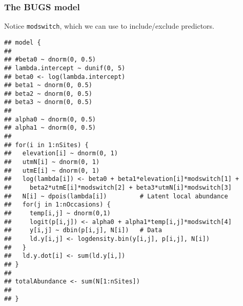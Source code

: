 \documentclass[color=usenames,dvipsnames]{beamer}\usepackage[]{graphicx}\usepackage[]{color}
\makeatletter
\newenvironment{kframe}{%
 \def\at@end@of@kframe{}%
 \ifinner\ifhmode%
  \def\at@end@of@kframe{\end{minipage}}%
  \begin{minipage}{\columnwidth}%
 \fi\fi%
 \def\FrameCommand##1{\hskip\@totalleftmargin \hskip-\fboxsep
 \colorbox{shadecolor}{##1}\hskip-\fboxsep
     \hskip-\linewidth \hskip-\@totalleftmargin \hskip\columnwidth}%
 \MakeFramed {\advance\hsize-\width
   \@totalleftmargin\z@ \linewidth\hsize
   \@setminipage}}%
 {\par\unskip\endMakeFramed%
 \at@end@of@kframe}
\newenvironment{knitrout}{}{} %
\makeatother
\begin{document}
\begin{frame}[fragile]
  \frametitle{The BUGS model}
  \small
  Notice \alert{\tt modswitch}, which we can use to include/exclude
  predictors. 
  \tiny
\begin{knitrout}\tiny
{}\color{fgcolor}\begin{kframe}
\begin{verbatim}
## model {
## 
## #beta0 ~ dnorm(0, 0.5)  
## lambda.intercept ~ dunif(0, 5)
## beta0 <- log(lambda.intercept)
## beta1 ~ dnorm(0, 0.5)
## beta2 ~ dnorm(0, 0.5)
## beta3 ~ dnorm(0, 0.5)
## 
## alpha0 ~ dnorm(0, 0.5)  
## alpha1 ~ dnorm(0, 0.5)
## 
## for(i in 1:nSites) {
##   elevation[i] ~ dnorm(0, 1)
##   utmN[i] ~ dnorm(0, 1)
##   utmE[i] ~ dnorm(0, 1)
##   log(lambda[i]) <- beta0 + beta1*elevation[i]*modswitch[1] +
##     beta2*utmE[i]*modswitch[2] + beta3*utmN[i]*modswitch[3] 
##   N[i] ~ dpois(lambda[i])         # Latent local abundance
##   for(j in 1:nOccasions) {
##     temp[i,j] ~ dnorm(0,1)
##     logit(p[i,j]) <- alpha0 + alpha1*temp[i,j]*modswitch[4]
##     y[i,j] ~ dbin(p[i,j], N[i])   # Data
##     ld.y[i,j] <- logdensity.bin(y[i,j], p[i,j], N[i])
##   }
##   ld.y.dot[i] <- sum(ld.y[i,])
## }
## 
## totalAbundance <- sum(N[1:nSites])
## 
## }
\end{verbatim}
\end{kframe}
\end{knitrout}

\end{frame}
\end{document}
